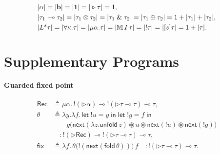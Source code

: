 \begin{appbdef}
\begin{align*}
  &|\alpha|=|\textbf{b}|=|\textbf{1}|=|\triangleright\tau|=1, \\
  &|\tau_1\multimap\tau_2|=|\tau_1\otimes\tau_2|=|\tau_1\;\&\;\tau_2|=|\tau_1\oplus\tau_2|
    =1+|\tau_1|+|\tau_2|, \\
  &|L^s\tau|=|\forall\kappa.\tau|=|\mu\alpha.\tau|=|\mathbb{M}\,{ I}\, \tau|
    =|!\tau|=|[s]\tau|=1+|\tau|.
\end{align*}
\end{appbdef}

\section{Supplementary Programs}
\label{sec:appb-programs}

\paragraph{Guarded fixed point}\mbox{}
\begin{align*}
\mathsf{Rec}
  &\triangleq
    \mu\alpha.\,
    !(\triangleright\alpha)
    \multimap !(\triangleright\tau\multimap\tau)
    \multimap\tau,
    \\[6pt]
\theta
  &\triangleq
    \lambda y.\lambda f.\,
    \mathsf{let}\;!u=y\;\mathsf{in}\;
    \mathsf{let}\;!g=f\;\mathsf{in}
    \\
  &\qquad
    g\bigl(
      \mathsf{next}(\lambda z.\mathsf{unfold}\,z)
      \circledast u
      \circledast \mathsf{next}(!u)
      \circledast \mathsf{next}(!g)
    \bigr)
    \\
  &\quad:
    !(\triangleright\mathsf{Rec})
    \multimap !(\triangleright\tau\multimap\tau)
    \multimap\tau,
    \\[6pt]
\mathsf{fix}
  &\triangleq
    \lambda f.\,
    \theta
    \bigl(!(\mathsf{next}(\mathsf{fold}\,\theta))\bigr)
    \,f
  \quad:
    !(\triangleright\tau\multimap\tau)
    \multimap\tau.
\end{align*}

